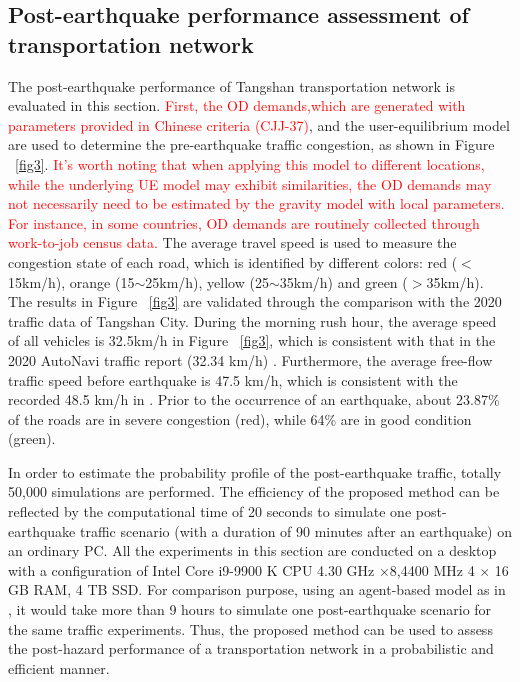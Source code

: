 \documentclass[review,11pt,nonatbib]{elsarticle}
\begin{document}
\subsection{Post-earthquake performance assessment of transportation network}
The post-earthquake performance of Tangshan transportation network is evaluated in this section. \textcolor{red}{First, the OD  demands,which are generated with parameters provided in Chinese criteria (CJJ-37)}, and the user-equilibrium model are used to determine the pre-earthquake traffic congestion, as shown in Figure ~\ref{fig3}. \textcolor{red}{It's worth noting that when applying this model to different locations, while the underlying UE model may exhibit similarities, the OD demands may not necessarily need to be estimated by the gravity model with local parameters. For instance, in some countries, OD demands are routinely collected through work-to-job census data.} The average travel speed is used to measure the congestion state of each road, which is identified by different colors: red ($<$ 15km/h), orange (15$\sim$25km/h), yellow (25$\sim$35km/h) and green ($>$35km/h). The results in Figure ~\ref{fig3} are validated through the comparison with the 2020 traffic data of Tangshan City. During the morning rush hour, the average speed of all vehicles is 32.5km/h in Figure ~\ref{fig3}, which is consistent with that in the 2020 AutoNavi traffic report (32.34 km/h) \citep{autonavi2020}. Furthermore, the average free-flow traffic speed before earthquake is 47.5 km/h, which is consistent with the recorded 48.5 km/h in \citet{autonavi2020}. Prior to the occurrence of an earthquake, about 23.87\% of the roads are in severe congestion (red), while 64\% are in good condition (green).

\par  In order to estimate the probability profile of the post-earthquake traffic, totally 50,000 simulations are performed. The efficiency of the proposed method can be reflected by the computational time of 20 seconds to simulate one post-earthquake traffic scenario (with a duration of 90 minutes after an earthquake) on an ordinary PC. All the experiments in this section are conducted on a desktop with a configuration of Intel Core i9-9900 K CPU 4.30 GHz ×8,4400 MHz 4 $\times$ 16 GB RAM, 4 TB SSD. For comparison purpose, using an agent-based model as in  \citep{feng2017post}, it would take more than 9 hours to simulate one post-earthquake scenario for the same traffic experiments. Thus, the proposed method can be used to assess the post-hazard performance of a transportation network in a probabilistic and efficient manner. 
\end{document}

